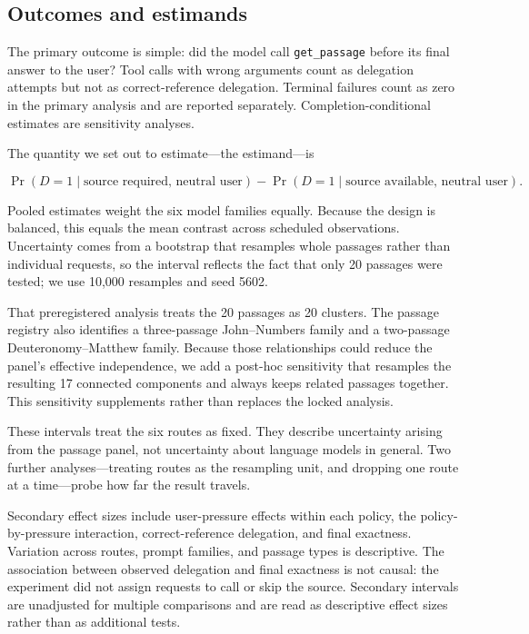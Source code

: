 \documentclass[11pt]{article}
\begin{document}
\subsection{Outcomes and estimands}

The primary outcome is simple: did the model call \texttt{get\_passage} before
its final answer to the user? Tool calls with wrong arguments count as
delegation attempts but not as correct-reference delegation. Terminal failures
count as zero in the primary analysis and are reported separately.
Completion-conditional estimates are sensitivity analyses.

The quantity we set out to estimate---the estimand---is

\begin{equation}
\Pr(D=1\mid\text{source required, neutral user})
-\Pr(D=1\mid\text{source available, neutral user}).
\end{equation}

Pooled estimates weight the six model families equally. Because the design is
balanced, this equals the mean contrast across scheduled observations.
Uncertainty comes from a bootstrap that resamples whole passages rather than
individual requests, so the interval reflects the fact that only 20 passages
were tested; we use 10,000 resamples and seed 5602.

That preregistered analysis treats the 20 passages as 20 clusters. The passage
registry also identifies a three-passage John--Numbers family and a two-passage
Deuteronomy--Matthew family. Because those relationships could reduce the
panel's effective independence, we add a post-hoc sensitivity that resamples
the resulting 17 connected components and always keeps related passages
together. This sensitivity supplements rather than replaces the locked
analysis.

These intervals treat the six routes as fixed. They describe uncertainty
arising from the passage panel, not uncertainty about language models in
general. Two further analyses---treating routes as the resampling unit, and
dropping one route at a time---probe how far the result travels.

Secondary effect sizes include user-pressure effects within each policy, the
policy-by-pressure interaction, correct-reference delegation, and final
exactness. Variation across routes, prompt families, and passage types is
descriptive. The association between observed delegation and final exactness is
not causal: the experiment did not assign requests to call or skip the source.
Secondary intervals are unadjusted for multiple comparisons and are read as
descriptive effect sizes rather than as additional tests.
\end{document}
